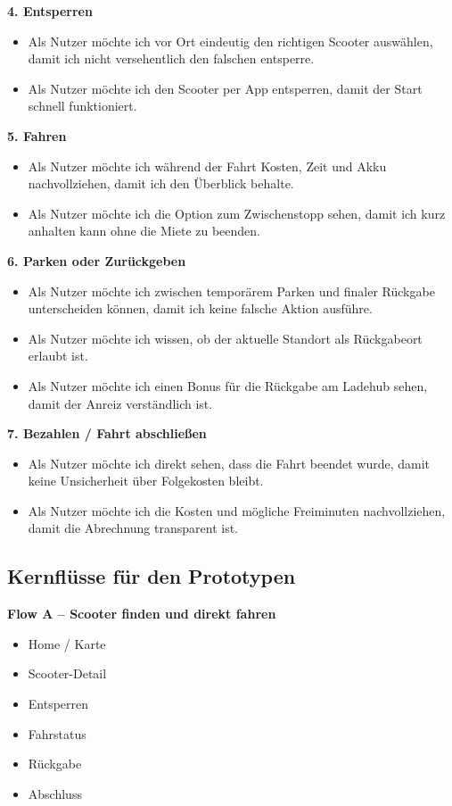 \documentclass[11pt,a4paper]{article}
\begin{document}
\textbf{4. Entsperren}
\begin{itemize}
  \item Als Nutzer m\"ochte ich vor Ort eindeutig den richtigen Scooter ausw\"ahlen, damit ich nicht versehentlich den falschen entsperre.
  \item Als Nutzer m\"ochte ich den Scooter per App entsperren, damit der Start schnell funktioniert.
\end{itemize}

\textbf{5. Fahren}
\begin{itemize}
  \item Als Nutzer m\"ochte ich w\"ahrend der Fahrt Kosten, Zeit und Akku nachvollziehen, damit ich den \"Uberblick behalte.
  \item Als Nutzer m\"ochte ich die Option zum Zwischenstopp sehen, damit ich kurz anhalten kann ohne die Miete zu beenden.
\end{itemize}

\textbf{6. Parken oder Zur\"uckgeben}
\begin{itemize}
  \item Als Nutzer m\"ochte ich zwischen tempor\"arem Parken und finaler R\"uckgabe unterscheiden k\"onnen, damit ich keine falsche Aktion ausf\"uhre.
  \item Als Nutzer m\"ochte ich wissen, ob der aktuelle Standort als R\"uckgabeort erlaubt ist.
  \item Als Nutzer m\"ochte ich einen Bonus f\"ur die R\"uckgabe am Ladehub sehen, damit der Anreiz verst\"andlich ist.
\end{itemize}

\textbf{7. Bezahlen / Fahrt abschlie{\ss}en}
\begin{itemize}
  \item Als Nutzer m\"ochte ich direkt sehen, dass die Fahrt beendet wurde, damit keine Unsicherheit \"uber Folgekosten bleibt.
  \item Als Nutzer m\"ochte ich die Kosten und m\"ogliche Freiminuten nachvollziehen, damit die Abrechnung transparent ist.
\end{itemize}

\subsection{Kernfl\"usse f\"ur den Prototypen}
\textbf{Flow A -- Scooter finden und direkt fahren}
\begin{itemize}
  \item Home / Karte
  \item Scooter-Detail
  \item Entsperren
  \item Fahrstatus
  \item R\"uckgabe
  \item Abschluss
\end{itemize}
\end{document}

